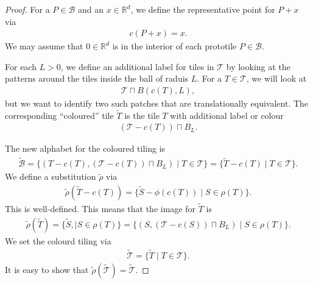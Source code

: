 \documentclass[10pt,a4paper]{amsart}
\begin{document}
\begin{proof}
    For a $P\in\mathcal{B}$
    and an $x\in\mathbb{R}^d$, we define the representative point for $P+x$ via
    \begin{align*}
        c(P+x)=x.
    \end{align*}
    We may assume that $0\in\mathbb{R}^d$ is in the interior of each prototile $P\in\mathcal{{B}}$.

    For each $L>0$, we
    define an additional label for tiles in
    $\mathcal{T}$ by 
    looking at the patterns around the tiles inside the ball of raduis $L$.
    For  a $T\in\mathcal{T}$, 
    we will look at
\begin{align*}\mathcal{T}\sqcap B(c(T),L),
    \end{align*}
    but we want to identify two such patches that are translationally equivalent.
    The
    corresponding ``coloured'' tile $\tilde{T}$ is the tile $T$ with additional label or colour
    \begin{align*}
        (\mathcal{T}-c(T))\sqcap B_L.
    \end{align*}

    The new alphabet for the coloured tiling is
    \begin{align*}
        \tilde{\mathcal{B}}=\{(T-c(T),(\mathcal{T}-c(T))\sqcap B_L)\mid T\in\mathcal{T}\}
        =\{\tilde{T}-c(T)\mid T\in\mathcal{T}\}.
    \end{align*} 
    We define a substitution $\tilde{\rho}$ via
    \begin{align*}
        \tilde{\rho}(\tilde{T}-c(T))=
        \{\tilde{S}-\phi(c(T))\mid S\in\rho(T)\}.
    \end{align*}
    This is well-defined.
    This means that the image for $\tilde{T}$ is
    \begin{align*}
        \tilde{\rho}(\tilde{T})=\{\tilde{S},\mid S\in\rho(T)\}=\{(S,(\mathcal{T}-c(S))\sqcap B_L)\mid S\in\rho(T)\}.
    \end{align*}
    We set the colourd tiling via
    \begin{align*}
        \tilde{\mathcal{T}}=\{\tilde{T}\mid T\in\mathcal{T}\}.
    \end{align*}
    It is easy to show that $\tilde{\rho}(\tilde{\mathcal{T}})=\tilde{\mathcal{T}}$.


\end{proof}
\end{document}
